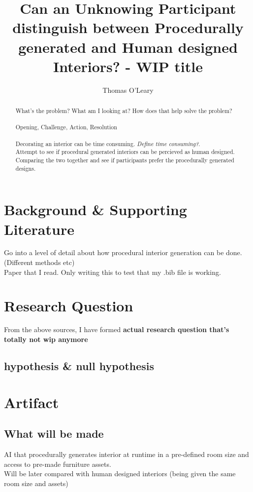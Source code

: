 \documentclass[journal]{IEEEtran}
\begin{document}
\title{Can an Unknowing Participant distinguish between Procedurally generated and Human designed Interiors? - WIP title}

\author{Thomas O'Leary}

\maketitle

\begin{abstract}
    What's the problem? What am I looking at? How does that help solve the problem? \\
    \\
    Opening, Challenge, Action, Resolution \\
    \\
    Decorating an interior can be time consuming. \emph{Define time consuming?}.
    \\
    Attempt to see if procedural generated interiors can be percieved as human designed.
    Comparing the two together and see if participants prefer the procedurally generated designs.
\end{abstract}


    
\section{Background \& Supporting Literature}
    Go into a level of detail about how procedural interior generation can be done. (Different methods etc)
    \\
    Paper that I read. Only writing this to test that my .bib file is working. \cite{real-time}

\section{Research Question}
    From the above sources, I have formed \textbf{actual research question that's totally not wip anymore}
    \subsection{hypothesis \& null hypothesis}

\section{Artifact}
    \subsection{What will be made}
        AI that procedurally generates interior at runtime in a pre-defined room size and access to pre-made furniture assets. \\
        Will be later compared with human designed interiors (being given the same room size and assets)
\end{document}
